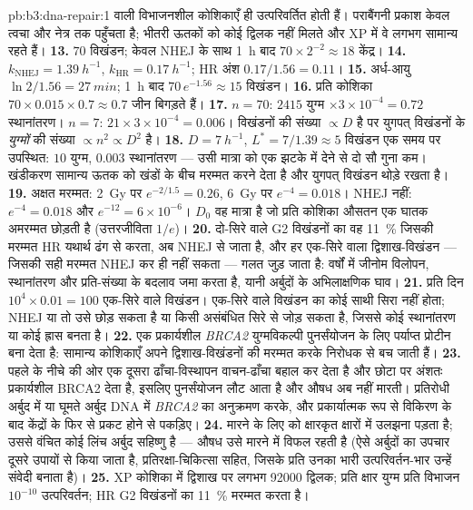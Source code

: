 \begin{solution}{pb:b3:dna-repair:1}
वाली विभाजनशील कोशिकाएँ ही उत्परिवर्तित होती हैं। पराबैंगनी प्रकाश
केवल त्वचा और नेत्र तक पहुँचता है; भीतरी ऊतकों को कोई द्विलक नहीं
मिलते और XP में वे लगभग सामान्य रहते हैं।
\textbf{13.} $70$ विखंडन; केवल NHEJ के साथ \qty{1}{h} बाद $70\times
2^{-2} \approx 18$ केंद्र।
\textbf{14.} $k_{\text{NHEJ}} = \qty{1.39}{h^{-1}}$, $k_{\text{HR}} =
\qty{0.17}{h^{-1}}$; HR अंश $0.17/1.56 = 0.11$।
\textbf{15.} अर्ध-आयु $\ln 2/1.56 = \qty{27}{min}$; \qty{1}{h} बाद
$70\,e^{-1.56} \approx 15$ विखंडन।
\textbf{16.} प्रति कोशिका $70\times 0.015\times 0.7 \approx 0.7$ जीन
बिगड़ते हैं।
\textbf{17.} $n = 70$: $2415$ युग्म $\times 3\times 10^{-4} = 0.72$
स्थानांतरण। $n = 7$: $21\times 3\times 10^{-4} = 0.006$। विखंडनों की
संख्या $\propto D$ है पर युगपत् विखंडनों के \emph{युग्मों} की संख्या
$\propto n^{2} \propto D^{2}$ है।
\textbf{18.} $D = \qty{7}{h^{-1}}$, $L^{*} = 7/1.39 \approx 5$ विखंडन
एक समय पर उपस्थित: $10$ युग्म, $0.003$ स्थानांतरण --- उसी मात्रा को
एक झटके में देने से दो सौ गुना कम। खंडीकरण सामान्य ऊतक को खंडों के बीच
मरम्मत करने देता है और युगपत् विखंडन थोड़े रखता है।
\textbf{19.} अक्षत मरम्मत: \qty{2}{Gy} पर $e^{-2/1.5} = 0.26$,
\qty{6}{Gy} पर $e^{-4} = 0.018$। NHEJ नहीं: $e^{-4} = 0.018$ और
$e^{-12} = 6\times 10^{-6}$। $D_{0}$ वह मात्रा है जो प्रति कोशिका औसतन
एक घातक अमरम्मत  छोड़ती है (उत्तरजीविता $1/e$)।
\textbf{20.} दो-सिरे वाले G2 विखंडनों का वह \qty{11}{\%} जिसकी मरम्मत
HR यथार्थ ढंग से करता, अब NHEJ से जाता है, और हर एक-सिरे वाला
द्विशाख-विखंडन --- जिसकी सही मरम्मत NHEJ कर ही नहीं सकता --- गलत जुड़
जाता है: वर्षों में जीनोम विलोपन, स्थानांतरण और प्रति-संख्या के बदलाव
जमा करता है, यानी \emph{} अर्बुदों के अभिलाक्षणिक घाव।
\textbf{21.} प्रति दिन $10^{4}\times 0.01 = 100$ एक-सिरे वाले विखंडन।
एक-सिरे वाले विखंडन का कोई साथी सिरा नहीं होता; NHEJ या तो उसे छोड़
सकता है या किसी असंबंधित सिरे से जोड़ सकता है, जिससे कोई स्थानांतरण या
कोई ह्रास बनता है।
\textbf{22.} एक प्रकार्यशील \emph{BRCA2} युग्मविकल्पी पुनर्संयोजन के
लिए पर्याप्त प्रोटीन बना देता है: सामान्य कोशिकाएँ अपने द्विशाख-विखंडनों
की मरम्मत करके निरोधक से बच जाती हैं।
\textbf{23.} पहले के नीचे की ओर एक दूसरा ढाँचा-विस्थापन वाचन-ढाँचा बहाल
कर देता है और छोटा पर अंशतः प्रकार्यशील BRCA2 देता है, इसलिए
पुनर्संयोजन लौट आता है और औषध अब नहीं मारती। प्रतिरोधी अर्बुद में या
घूमते अर्बुद DNA में \emph{BRCA2} का अनुक्रमण करके, और प्रकार्यात्मक
रूप से विकिरण के बाद  केंद्रों के फिर से प्रकट होने से पकड़िए।
\textbf{24.} मारने के लिए  को क्षारकृत क्षारों में उलझना
पड़ता है; उससे वंचित कोई लिंच अर्बुद सहिष्णु है --- औषध उसे मारने में
विफल रहती है (ऐसे अर्बुदों का उपचार दूसरे उपायों से किया जाता है,
प्रतिरक्षा-चिकित्सा सहित, जिसके प्रति उनका भारी उत्परिवर्तन-भार उन्हें
संवेदी बनाता है)।
\textbf{25.} XP कोशिका में द्विशाख पर लगभग \num{92000} द्विलक; प्रति
क्षार युग्म प्रति विभाजन $10^{-10}$ उत्परिवर्तन; HR G2 विखंडनों का
\qty{11}{\%} मरम्मत करता है।
\end{solution}
